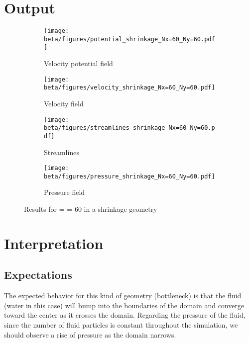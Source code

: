 \section{Output}
\begin{figure}[htbp]
      \centering
      \begin{subfigure}{.45\textwidth}
            \centering
            \texttt{[image: beta/figures/potential\_shrinkage\_Nx=60\_Ny=60.pdf]}
            \caption{Velocity potential field}\label{fig:vel_pot_field}
      \end{subfigure}
      \begin{subfigure}{.45\textwidth}
            \centering
            \texttt{[image: beta/figures/velocity\_shrinkage\_Nx=60\_Ny=60.pdf]}
            \caption{Velocity field}\label{fig:velocity_field}
      \end{subfigure}

      \centering
      \begin{subfigure}{.45\textwidth}
            \centering
            \texttt{[image: beta/figures/streamlines\_shrinkage\_Nx=60\_Ny=60.pdf]}
            \caption{Streamlines}\label{fig:streamlines}
      \end{subfigure}
      \begin{subfigure}{.45\textwidth}
            \centering
            \texttt{[image: beta/figures/pressure\_shrinkage\_Nx=60\_Ny=60.pdf]}
            \caption{Pressure field}\label{fig:pressure_field}
      \end{subfigure}
      \caption{Results for  =  = \num{60} in a shrinkage geometry}
\end{figure}

\newpage
\section{Interpretation}
\subsection{Expectations}
The expected behavior for this kind of geometry (bottleneck) is that the fluid
(water in this case) will bump into the boundaries of the domain and converge
toward the center as it crosses the domain. Regarding the pressure of the
fluid, since the number of fluid particles is constant throughout the
simulation, we should observe a rise of pressure as the domain narrows.


